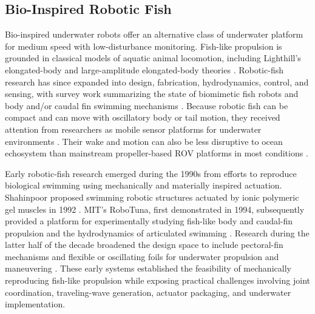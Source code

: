 \documentclass{uhcoethesis}
\begin{document}
\subsection{Bio-Inspired Robotic Fish}
Bio-inspired underwater robots offer an alternative class of underwater platform for medium speed with low-disturbance monitoring. Fish-like propulsion is grounded in classical models of aquatic animal locomotion, including Lighthill's elongated-body and large-amplitude elongated-body theories \cite{Lighthill1969,Lighthill1971}. Robotic-fish research has since expanded into design, fabrication, hydrodynamics, control, and sensing, with survey work summarizing the state of biomimetic fish robots and body and/or caudal fin swimming mechanisms \cite{Yu2017,Duraisamy2019,Xie2021}. Because robotic fish can be compact and can move with oscillatory body or tail motion, they received attention from researchers as mobile sensor platforms for underwater environments \cite{Tan2011}. Their wake and motion can also be less disruptive to ocean echosystem than mainstream propeller-based ROV platforms in most conditions \cite{Marras2012,Polverino2013}.

Early robotic-fish research emerged during the 1990s from efforts to reproduce biological swimming using mechanically and materially inspired actuation. Shahinpoor proposed swimming robotic structures actuated by ionic polymeric gel muscles in 1992 \cite{Shahinpoor1992}. MIT's RoboTuna, first demonstrated in 1994, subsequently provided a platform for experimentally studying fish-like body and caudal-fin propulsion and the hydrodynamics of articulated swimming \cite{Thomson1994,Tolkoff1999}. Research during the latter half of the decade broadened the design space to include pectoral-fin mechanisms and flexible or oscillating foils for underwater propulsion and maneuvering \cite{Imaizumi1995,Kato1996}. These early systems established the feasibility of mechanically reproducing fish-like propulsion while exposing practical challenges involving joint coordination, traveling-wave generation, actuator packaging, and underwater implementation.
\end{document}
